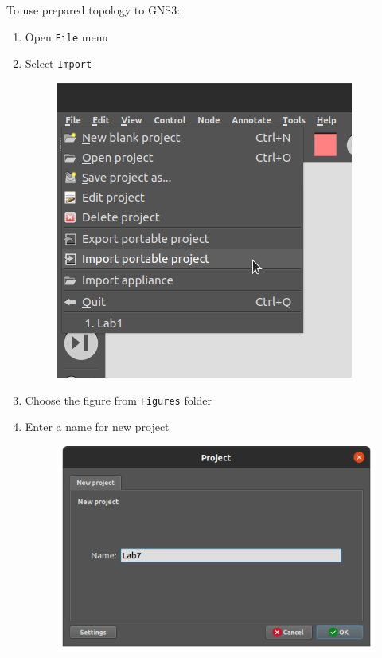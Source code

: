 \documentclass{../UTNetLab}
\begin{document}
    To use prepared topology to GNS3:
    \begin{enumerate}
        \item Open \texttt{File} menu
        \item Select \texttt{Import }
        \begin{figure}[H]
            \centering
            \includegraphics[scale=1.6]{img/import-1}
        \end{figure}
        \item Choose the figure from \texttt{Figures} folder
        \item Enter a name for new project
        \begin{figure}[H]
            \centering
            \includegraphics[scale=1.6]{img/import-2}
        \end{figure}
    \end{enumerate}
\end{document}
